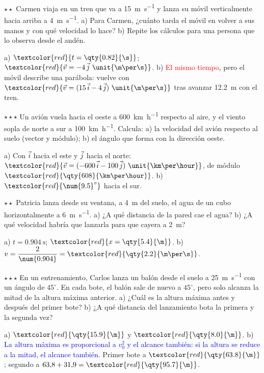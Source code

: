 \begin{exercise}
    \(\star\star\) Carmen viaja en un tren que va a \qty{15}{\m\per\s} y lanza su móvil verticalmente hacia arriba a
    \qty{4}{\m\per\s}. a) Para Carmen, ¿cuánto tarda el móvil en volver a sus manos y con qué velocidad lo hace? b) Repite los
    cálculos para una persona que lo observa desde el andén.
    \begin{solu}
        a) \(\textcolor{red}{t = \qty{0.82}{\s}}\); \(\textcolor{red}{\vec v = -4\,\jvec~\unit{\m\per\s}}\). b) \textcolor{red}{El mismo
        tiempo}, pero el móvil describe una parábola: vuelve con \(\textcolor{red}{\vec v = (15\,\ivec - 4\,\jvec)~\unit{\m\per\s}}\) tras
        avanzar \qty{12.2}{\m} con el tren.
    \end{solu}
\end{exercise}

\begin{exercise}
    \(\star\star\star\) Un avión vuela hacia el oeste a \qty{600}{\km\per\hour} respecto al aire, y el viento sopla de norte a sur a
    \qty{100}{\km\per\hour}. Calcula: a) la velocidad del avión respecto al suelo (vector y módulo); b) el ángulo que forma con la
    dirección oeste.
    \begin{solu}
        a) Con \(\vec{i}\) hacia el este y \(\vec{j}\) hacia el norte: \(\textcolor{red}{\vec v = (-600\,\ivec - 100\,\jvec)~\unit{\km\per\hour}}\),
        de módulo \(\textcolor{red}{\qty{608}{\km\per\hour}}\). b) \(\textcolor{red}{\num{9.5}^\circ}\) hacia el sur.
    \end{solu}
\end{exercise}

\begin{exercise}
    \(\star\star\) Patricia lanza desde su ventana, a \qty{4}{\m} del suelo, el agua de un cubo horizontalmente a \qty{6}{\m\per\s}.
    a) ¿A qué distancia de la pared cae el agua? b) ¿A qué velocidad habría que lanzarla para que cayera a \qty{2}{\m}?
    \begin{solu}
        a) \(t = \qty{0.904}{\s}\); \(\textcolor{red}{x = \qty{5.4}{\m}}\). b) \(v = \dfrac{2}{\num{0.904}} = \textcolor{red}{\qty{2.2}{\m\per\s}}\).
    \end{solu}
\end{exercise}

\begin{exercise}
    \(\star\star\star\) En un entrenamiento, Carlos lanza un balón desde el suelo a \qty{25}{\m\per\s} con un ángulo de \(45^\circ\).
    En cada bote, el balón sale de nuevo a \(45^\circ\), pero solo alcanza la mitad de la altura máxima anterior. a) ¿Cuál es la
    altura máxima antes y después del primer bote? b) ¿A qué distancia del lanzamiento bota la primera y la segunda vez?
    \begin{solu}
        a) \(\textcolor{red}{\qty{15.9}{\m}}\) y \(\textcolor{red}{\qty{8.0}{\m}}\). b) \textcolor{blue}{La altura máxima es
        proporcional a \(v_0^2\) y el alcance también: si la altura se reduce a la mitad, el alcance también.} Primer bote a
        \(\textcolor{red}{\qty{63.8}{\m}}\); segundo a \(63{,}8 + 31{,}9 = \textcolor{red}{\qty{95.7}{\m}}\).
    \end{solu}
\end{exercise}

